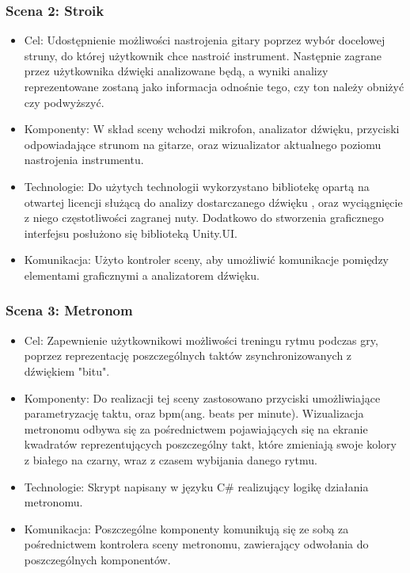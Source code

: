 \subsubsection{Scena 2: Stroik}

\begin{itemize}
\item Cel: Udostępnienie możliwości nastrojenia gitary poprzez wybór docelowej struny, do której użytkownik chce nastroić instrument. Następnie zagrane przez użytkownika dźwięki analizowane będą, a wyniki analizy reprezentowane zostaną jako informacja odnośnie tego, czy ton należy obniżyć czy podwyższyć.
\item Komponenty: W skład sceny wchodzi mikrofon, analizator dźwięku, przyciski odpowiadające strunom na gitarze, oraz wizualizator aktualnego poziomu nastrojenia instrumentu.  
\item Technologie: Do użytych technologii wykorzystano bibliotekę opartą na otwartej licencji służącą do analizy dostarczanego dźwięku \cite{https://github.com/nakakq/AudioPitchEstimatorForUnity}, oraz wyciągnięcie z niego częstotliwości zagranej nuty. Dodatkowo do stworzenia graficznego interfejsu posłużono się biblioteką Unity.UI.   
\item Komunikacja: Użyto kontroler sceny, aby umożliwić komunikacje pomiędzy elementami graficznymi a analizatorem dźwięku. 
\end{itemize}

\subsubsection{Scena 3: Metronom}

\begin{itemize}
\item Cel: Zapewnienie użytkownikowi możliwości treningu rytmu podczas gry, poprzez reprezentację poszczególnych taktów zsynchronizowanych z dźwiękiem "bitu".
\item Komponenty: Do realizacji tej sceny zastosowano przyciski umożliwiające parametryzację taktu, oraz bpm(ang. beats per minute). Wizualizacja metronomu odbywa się za pośrednictwem pojawiających się na ekranie kwadratów reprezentujących poszczególny takt, które zmieniają swoje kolory z białego na czarny, wraz z czasem wybijania danego rytmu.
\item Technologie: Skrypt napisany w języku C\# realizujący logikę działania metronomu.
\item Komunikacja: Poszczególne komponenty komunikują się ze sobą za pośrednictwem kontrolera sceny metronomu, zawierający odwołania do poszczególnych komponentów.
\end{itemize}

